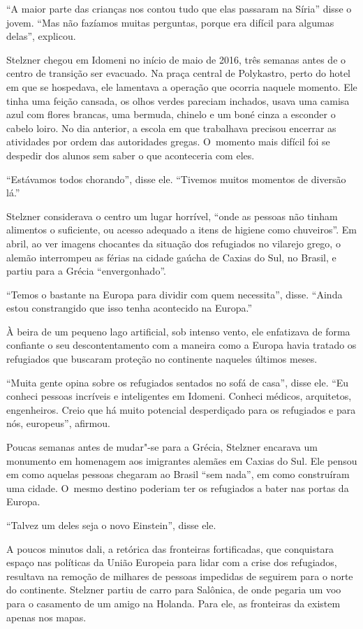 ``A maior parte das crianças nos contou tudo que elas passaram na
Síria'' disse o jovem. ``Mas não fazíamos muitas perguntas, porque era
difícil para algumas delas'', explicou.

Stelzner chegou em Idomeni no início de maio de 2016, três semanas antes
de o centro de transição ser evacuado. Na praça central de Polykastro,
perto do hotel em que se hospedava, ele lamentava a operação que ocorria
naquele momento. Ele tinha uma feição cansada, os olhos verdes pareciam
inchados, usava uma camisa azul com flores brancas, uma bermuda, chinelo
e um boné cinza a esconder o cabelo loiro. No dia anterior, a escola em
que trabalhava precisou encerrar as atividades por ordem das autoridades
gregas. O~momento mais difícil foi se despedir dos alunos sem saber o
que aconteceria com eles.

``Estávamos todos chorando'', disse ele. ``Tivemos muitos momentos de
diversão lá.''

Stelzner considerava o centro um lugar horrível, ``onde as pessoas não
tinham alimentos o suficiente, ou acesso adequado a itens de higiene
como chuveiros''. Em abril, ao ver imagens chocantes da situação dos
refugiados no vilarejo grego, o alemão interrompeu as férias na cidade
gaúcha de Caxias do Sul, no Brasil, e partiu para a Grécia
``envergonhado''.

``Temos o bastante na Europa para dividir com quem necessita'', disse.
``Ainda estou constrangido que isso tenha acontecido na Europa.''

À beira de um pequeno lago artificial, sob intenso vento, ele enfatizava
de forma confiante o seu descontentamento com a maneira como a Europa
havia tratado os refugiados que buscaram proteção no continente naqueles
últimos meses.

``Muita gente opina sobre os refugiados sentados no sofá de casa'',
disse ele. ``Eu conheci pessoas incríveis e inteligentes em Idomeni.
Conheci médicos, arquitetos, engenheiros. Creio que há muito potencial
desperdiçado para os refugiados e para nós, europeus'', afirmou.

Poucas semanas antes de mudar"-se para a Grécia, Stelzner encarava um
monumento em homenagem aos imigrantes alemães em Caxias do Sul. Ele
pensou em como aquelas pessoas chegaram ao Brasil ``sem nada'', em como
construíram uma cidade. O~mesmo destino poderiam ter os refugiados a
bater nas portas da Europa.

``Talvez um deles seja o novo Einstein'', disse ele.

A poucos minutos dali, a retórica das fronteiras fortificadas, que
conquistara espaço nas políticas da União Europeia para lidar com a
crise dos refugiados, resultava na remoção de milhares de pessoas
impedidas de seguirem para o norte do continente. Stelzner partiu de
carro para Salônica, de onde pegaria um voo para o casamento de um amigo
na Holanda. Para ele, as fronteiras da  existem apenas nos mapas.

